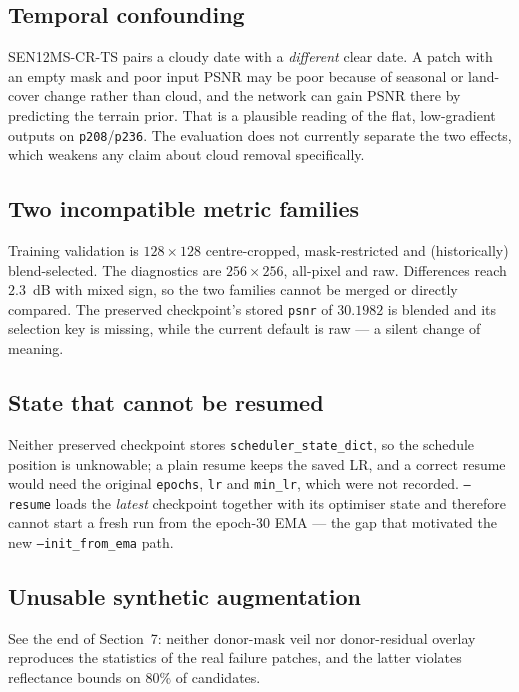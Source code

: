 \documentclass[10pt,a4paper]{article}
\newcommand{\code}[1]{\texttt{#1}}
\begin{document}
\subsection{Temporal confounding}

SEN12MS-CR-TS pairs a cloudy date with a \emph{different} clear date. A patch with an empty mask and
poor input PSNR may be poor because of seasonal or land-cover change rather than cloud, and the
network can gain PSNR there by predicting the terrain prior. That is a plausible reading of the
flat, low-gradient outputs on \code{p208}/\code{p236}. The evaluation does not currently separate
the two effects, which weakens any claim about cloud removal specifically.

\subsection{Two incompatible metric families}

Training validation is $128\times128$ centre-cropped, mask-restricted and (historically)
blend-selected. The diagnostics are $256\times256$, all-pixel and raw. Differences reach $2.3$~dB
with mixed sign, so the two families cannot be merged or directly compared. The preserved
checkpoint's stored \code{psnr} of $30.1982$ is blended and its selection key is missing, while the
current default is raw --- a silent change of meaning.

\subsection{State that cannot be resumed}

Neither preserved checkpoint stores \code{scheduler\_state\_dict}, so the schedule position is
unknowable; a plain resume keeps the saved LR, and a correct resume would need the original
\code{epochs}, \code{lr} and \code{min\_lr}, which were not recorded. \code{--resume} loads the
\emph{latest} checkpoint together with its optimiser state and therefore cannot start a fresh run
from the epoch-30 EMA --- the gap that motivated the new \code{--init\_from\_ema} path.

\subsection{Unusable synthetic augmentation}

See the end of Section~7: neither donor-mask veil nor donor-residual overlay reproduces the
statistics of the real failure patches, and the latter violates reflectance bounds on $80\%$ of
candidates.
\end{document}
